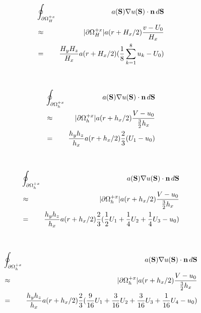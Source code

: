 \documentclass[10pt]{article}
\begin{document}
\begin{minipage}{1.75in}
\end{minipage} \ \ \ \ 
\begin{minipage}{4.00in}
\begin{eqnarray*}
& \oint_{\partial\Omega_H^{+x}} \!\!\! & a(\textbf{S}) \nabla u(\textbf{S})\cdot \textbf{n} \, d\textbf{S}  \\
& \approx & |\partial\Omega_H^{+x}| a(r+H_x/2) \frac{v - U_0}{H_x} \\
& = & \frac{H_yH_z}{H_x}  a(r+H_x/2) (\frac{1}{8} \sum_{k=1}^8 u_k - U_0)   \\
\end{eqnarray*}
\end{minipage}

\begin{minipage}{1.75in}
\end{minipage} \ \ \ \ 
\begin{minipage}{4.00in}
\begin{eqnarray*}
& \oint_{\partial\Omega_h^{+x}} \!\!\! & a(\textbf{S}) \nabla u(\textbf{S})\cdot \textbf{n} \, d\textbf{S}  \\
& \approx & |\partial\Omega_h^{+x}| a(r+h_x/2) \frac{V - u_0}{\frac{3}{2}h_x} \\
& = & \frac{h_yh_z}{h_x}  a(r+h_x/2) \frac{2}{3} (U_1 - u_0)   \\
\end{eqnarray*}
\end{minipage}

\begin{minipage}{1.75in}
\end{minipage} \ \ \ \ 
\begin{minipage}{4.00in}
\begin{eqnarray*}
& \oint_{\partial\Omega_h^{+x}}  \!\!\! & a(\textbf{S}) \nabla u(\textbf{S})\cdot \textbf{n} \, d\textbf{S}  \\
& \approx & |\partial\Omega_h^{+x}| a(r+h_x/2) \frac{V - u_0}{\frac{3}{2}h_x} \\
& = & \frac{h_yh_z}{h_x}  a(r+h_x/2) \frac{2}{3} (\frac{1}{2}U_1 + \frac{1}{4}U_2 + \frac{1}{4}U_3 - u_0)   \\
\end{eqnarray*}
\end{minipage}


\begin{minipage}{1.75in}
\end{minipage} \ \ \ \ 
\begin{minipage}{4.00in}
\begin{eqnarray*}
& \oint_{\partial\Omega_h^{+x}}  \!\!\! & a(\textbf{S}) \nabla u(\textbf{S})\cdot \textbf{n} \, d\textbf{S} \\
& \approx & |\partial\Omega_h^{+x}| a(r+h_x/2) \frac{V - u_0}{\frac{3}{2}h_x} \\
& = & \frac{h_yh_z}{h_x}  a(r+h_x/2) \frac{2}{3} (\frac{9}{16} U_1 + \frac{3}{16} U_2 + \frac{3}{16} U_3 + \frac{1}{16}U_4 - u_0)   \\
\end{eqnarray*}
\end{minipage}
\end{document}

